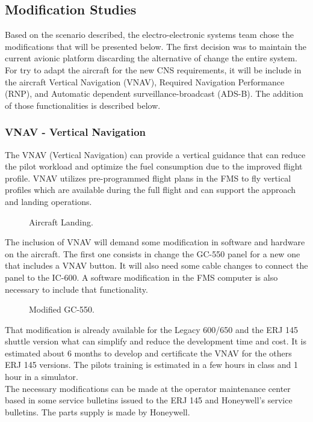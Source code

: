 \subsection{Modification Studies}

Based on the scenario described, the electro-electronic systems team chose the modifications that will be presented below. The first decision was to maintain the current avionic platform discarding the alternative of change the entire system.
\\For try to adapt the aircraft for the new CNS requirements, it will be include in the aircraft Vertical Navigation (VNAV), Required Navigation Performance (RNP),  and Automatic dependent surveillance-broadcast (ADS-B). The addition of those functionalities is described below.

\subsubsection{VNAV - Vertical Navigation}
The VNAV (Vertical Navigation) can provide a vertical guidance that can reduce the pilot workload and optimize the fuel consumption due to the improved flight profile. VNAV utilizes pre-programmed flight plans in the FMS to fly vertical profiles which are available during the full flight and can support the approach and landing operations. 

\begin{figure}[H] %
\caption{Aircraft Landing.}
\label{fig:AircraftLanding}
\end{figure} 

The inclusion of VNAV will demand some modification in software and hardware on the aircraft. The first one consists in change the GC-550 panel for a new one that includes a VNAV button. It will also need some cable changes to connect the panel to the IC-600. A software modification in the FMS computer is also necessary to include that functionality.

\begin{figure}[H] %
\caption{Modified GC-550.}
\label{fig:ModifiedGC550}
\end{figure} 

That modification is already available for the Legacy 600/650 and the ERJ 145 shuttle version what can simplify and reduce the development time and cost. It is estimated about 6 months to develop and certificate the VNAV for the others ERJ 145 versions. The pilots training is estimated in a few hours in class and 1 hour in a simulator. 
\\The necessary modifications can be made at the operator maintenance center based in some service bulletins issued to the ERJ 145 and Honeywell's service bulletins. The parts supply is made by Honeywell.

